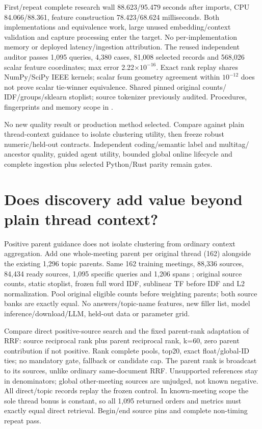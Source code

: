 \documentclass[11pt]{article}
\begin{document}
First/repeat complete research wall 88.623/95.479 seconds after imports,
CPU 84.066/88.361, feature construction 78.423/68.624 milliseconds. Both
implementations and equivalence work, large unused embedding/context validation
and capture processing enter the target. No per-implementation memory or
deployed latency/ingestion attribution. The reused independent auditor passes
1,095 queries, 4,380 cases, 81,008 selected records and 568,026 scalar feature
coordinates; max error 2.22$\times10^{-16}$. Exact rank replay shares
NumPy/SciPy IEEE kernels; scalar fsum geometry agreement within $10^{-12}$
does not prove scalar tie-winner equivalence. Shared pinned original counts/
IDF/groups/sklearn stoplist; source tokenizer previously audited. Procedures,
fingerprints and memory scope in
.

No new quality result or production method selected. Compare against plain
thread-context guidance to isolate clustering utility, then freeze robust
numeric/held-out contracts. Independent coding/semantic label and multitag/
ancestor quality, guided agent utility, bounded global online lifecycle and
complete ingestion plus selected Python/Rust parity remain gates.

\section{Does discovery add value beyond plain thread context?}
Positive parent guidance does not isolate clustering from ordinary context
aggregation. Add one whole-meeting parent per original thread (162) alongside
the existing 1,296 topic parents. Same 162 training meetings, 88,336 sources,
84,434 ready sources, 1,095 specific queries and 1,206 spans
\cite{zhong2021qmsum}; original source counts, static stoplist, frozen full
word IDF, sublinear TF before IDF and L2 normalization. Pool original eligible
counts before weighting parents; both source banks are exactly equal. No
answers/topic-name features, new filler list, model inference/download/LLM,
held-out data or parameter grid.

Compare direct positive-source search and the fixed parent-rank adaptation
of RRF\cite{rrf2009}: source reciprocal rank plus parent reciprocal rank,
k=60, zero parent contribution if not positive. Rank complete pools, top20,
exact float/global-ID ties; no mandatory gate, fallback or candidate cap.
The parent rank is broadcast to its sources, unlike ordinary same-document
RRF. Unsupported references stay in denominators; global other-meeting sources
are unjudged, not known negative. All direct/topic records replay the frozen
control. In known-meeting scope the sole thread bonus is constant, so all
1,095 returned orders and metrics must exactly equal direct retrieval.
Begin/end source pins and complete non-timing repeat pass.
\end{document}
